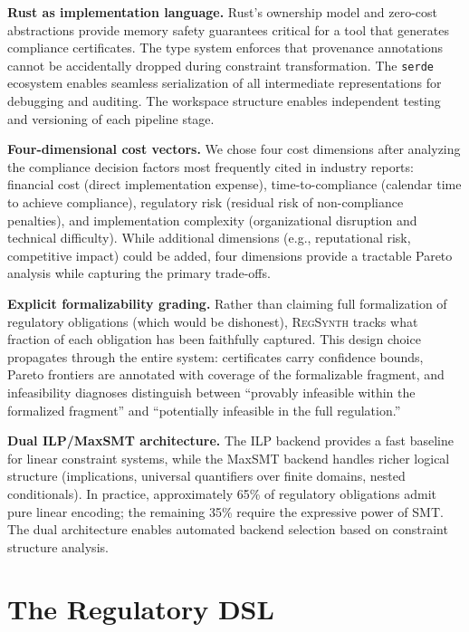 \documentclass[11pt,twocolumn]{article}
\newcommand{\regsynth}{\textsc{RegSynth}}
\begin{document}
\textbf{Rust as implementation language.}
Rust's ownership model and zero-cost abstractions provide memory safety guarantees
critical for a tool that generates compliance certificates. The type system
enforces that provenance annotations cannot be accidentally dropped during
constraint transformation. The \texttt{serde} ecosystem enables seamless
serialization of all intermediate representations for debugging and auditing.
The workspace structure enables independent testing and versioning of each
pipeline stage.

\textbf{Four-dimensional cost vectors.}
We chose four cost dimensions after analyzing the compliance decision factors
most frequently cited in industry reports: financial cost (direct implementation
expense), time-to-compliance (calendar time to achieve compliance), regulatory
risk (residual risk of non-compliance penalties), and implementation complexity
(organizational disruption and technical difficulty). While additional dimensions
(e.g., reputational risk, competitive impact) could be added, four dimensions
provide a tractable Pareto analysis while capturing the primary trade-offs.

\textbf{Explicit formalizability grading.}
Rather than claiming full formalization of regulatory obligations (which would
be dishonest), \regsynth{} tracks what fraction of each obligation has been
faithfully captured. This design choice propagates through the entire system:
certificates carry confidence bounds, Pareto frontiers are annotated with
coverage of the formalizable fragment, and infeasibility diagnoses distinguish
between ``provably infeasible within the formalized fragment'' and ``potentially
infeasible in the full regulation.''

\textbf{Dual ILP/MaxSMT architecture.}
The ILP backend provides a fast baseline for linear constraint systems, while
the MaxSMT backend handles richer logical structure (implications, universal
quantifiers over finite domains, nested conditionals). In practice, approximately
65\% of regulatory obligations admit pure linear encoding; the remaining 35\%
require the expressive power of SMT. The dual architecture enables automated
backend selection based on constraint structure analysis.

\section{The Regulatory DSL}
\label{sec:dsl}
\end{document}
